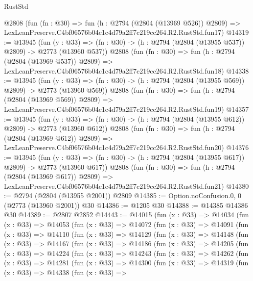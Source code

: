 \begin{lexlean}{RustStd}
\begin{coremodule}
    @2808
    (fun (fn : @30) =>
    fun (h : @2794 (@2804 (@13969 @526)) @2809) =>
    LexLeanPreserve.C4bf06576b04c1c4d79a2ff7c219cc264.R2.RustStd.fun17)
@14319 := @13945
    (fun (y : @33) => (fn : @30) -> (h : @2794 (@2804 (@13955 @537)) @2809) -> @2773 (@13960 @537))
    @2808
    (fun (fn : @30) =>
    fun (h : @2794 (@2804 (@13969 @537)) @2809) =>
    LexLeanPreserve.C4bf06576b04c1c4d79a2ff7c219cc264.R2.RustStd.fun18)
@14338 := @13945
    (fun (y : @33) => (fn : @30) -> (h : @2794 (@2804 (@13955 @569)) @2809) -> @2773 (@13960 @569))
    @2808
    (fun (fn : @30) =>
    fun (h : @2794 (@2804 (@13969 @569)) @2809) =>
    LexLeanPreserve.C4bf06576b04c1c4d79a2ff7c219cc264.R2.RustStd.fun19)
@14357 := @13945
    (fun (y : @33) => (fn : @30) -> (h : @2794 (@2804 (@13955 @612)) @2809) -> @2773 (@13960 @612))
    @2808
    (fun (fn : @30) =>
    fun (h : @2794 (@2804 (@13969 @612)) @2809) =>
    LexLeanPreserve.C4bf06576b04c1c4d79a2ff7c219cc264.R2.RustStd.fun20)
@14376 := @13945
    (fun (y : @33) => (fn : @30) -> (h : @2794 (@2804 (@13955 @617)) @2809) -> @2773 (@13960 @617))
    @2808
    (fun (fn : @30) =>
    fun (h : @2794 (@2804 (@13969 @617)) @2809) =>
    LexLeanPreserve.C4bf06576b04c1c4d79a2ff7c219cc264.R2.RustStd.fun21)
@14380 := @2794 (@2804 (@13955 @2001)) @2809
@14385 := Option.noConfusion.{0, 0} (@2773 (@13960 @2001)) @30
@14386 := @1205 @30
@14388 := @14385 @14386 @30
@14389 := @2807 @2852
@14443 := @14015
    (fun (x : @33) =>
    @14034
      (fun (x : @33) =>
      @14053
        (fun (x : @33) =>
        @14072
          (fun (x : @33) =>
          @14091
            (fun (x : @33) =>
            @14110
              (fun (x : @33) =>
              @14129
                (fun (x : @33) =>
                @14148
                  (fun (x : @33) =>
                  @14167
                    (fun (x : @33) =>
                    @14186
                      (fun (x : @33) =>
                      @14205
                        (fun (x : @33) =>
                        @14224
                          (fun (x : @33) =>
                          @14243
                            (fun (x : @33) =>
                            @14262
                              (fun (x : @33) =>
                              @14281
                                (fun (x : @33) =>
                                @14300
                                  (fun (x : @33) =>
                                  @14319
                                    (fun (x : @33) =>
                                    @14338
                                      (fun (x : @33) =>

\end{coremodule}
\end{lexlean}
